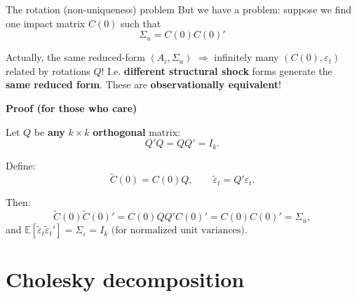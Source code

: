 \documentclass{beamer}
\begin{document}
\begin{frame}{The rotation (non-uniqueness) problem}
But we have a problem: suppose we find one impact matrix $C(0)$ such that
\[
\Sigma_u = C(0) C(0)'
\]

Actually, the same reduced-form $(A_i,\Sigma_u)$ $\Rightarrow$ infinitely many
$(C(0),\varepsilon_t)$ related by rotations $Q$! I.e. \textbf{different structural shock} forms generate the \textbf{same reduced form}. These are \textbf{observationally equivalent}!

\medskip

\scriptsize

\textbf{Proof (for those who care)}

\medskip

Let $Q$ be\textbf{ any }$k\times k$ \textbf{orthogonal} matrix:
\[
Q'Q = QQ' = I_k.
\]

Define:
\[
\tilde C(0) = C(0) Q,
\qquad
\tilde\varepsilon_t = Q' \varepsilon_t.
\]

Then:
\[
\tilde C(0)\tilde C(0)' = C(0) Q Q' C(0)' = C(0) C(0)' = \Sigma_u,
\]
and $\mathbb{E}[\tilde\varepsilon_t \tilde\varepsilon_t'] = \Sigma_\varepsilon = I_k \text{ (for normalized unit variances)}$.

\end{frame}







\section{Cholesky decomposition}
\end{document}

